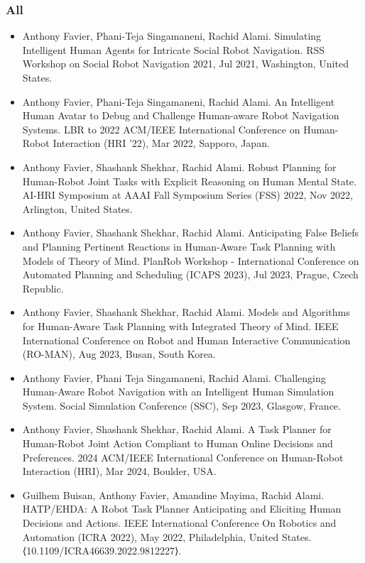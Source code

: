 \subsubsection*{All}
\begin{itemize}

    \item Anthony Favier, Phani-Teja Singamaneni, Rachid Alami. Simulating Intelligent Human Agents for Intricate Social Robot Navigation. RSS Workshop on Social Robot Navigation 2021, Jul 2021, Washington, United States. 
    \item Anthony Favier, Phani-Teja Singamaneni, Rachid Alami. An Intelligent Human Avatar to Debug and Challenge Human-aware Robot Navigation Systems. LBR to 2022 ACM/IEEE International Conference on Human-Robot Interaction (HRI '22), Mar 2022, Sapporo, Japan. 
    \item Anthony Favier, Shashank Shekhar, Rachid Alami. Robust Planning for Human-Robot Joint Tasks with Explicit Reasoning on Human Mental State. AI-HRI Symposium at AAAI Fall Symposium Series (FSS) 2022, Nov 2022, Arlington, United States. 
    \item Anthony Favier, Shashank Shekhar, Rachid Alami. Anticipating False Beliefs and Planning Pertinent Reactions in Human-Aware Task Planning with Models of Theory of Mind. PlanRob Workshop - International Conference on Automated Planning and Scheduling (ICAPS 2023), Jul 2023, Prague, Czech Republic. 
    \item Anthony Favier, Shashank Shekhar, Rachid Alami. Models and Algorithms for Human-Aware Task Planning with Integrated Theory of Mind. IEEE International Conference on Robot and Human Interactive Communication (RO-MAN), Aug 2023, Busan, South Korea. 
    \item Anthony Favier, Phani Teja Singamaneni, Rachid Alami. Challenging Human-Aware Robot Navigation with an Intelligent Human Simulation System. Social Simulation Conference (SSC), Sep 2023, Glasgow, France. 
    
    \item Anthony Favier, Shashank Shekhar, Rachid Alami. A Task Planner for Human-Robot Joint Action Compliant to Human Online Decisions and Preferences. 2024 ACM/IEEE International Conference on Human-Robot Interaction (HRI), Mar 2024, Boulder, USA.
    
    \item Guilhem Buisan, Anthony Favier, Amandine Mayima, Rachid Alami. HATP/EHDA: A Robot Task Planner Anticipating and Eliciting Human Decisions and Actions. IEEE International Conference On Robotics and Automation (ICRA 2022), May 2022, Philadelphia, United States. ⟨10.1109/ICRA46639.2022.9812227⟩. 
    

\end{itemize}
